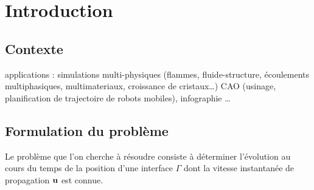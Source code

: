 \def\chapterabstract{}
\chapter{Introduction}

\section{Contexte}%

applications : simulations multi-physiques (flammes, fluide-structure, écoulements multiphasiques, multimateriaux, croissance de cristaux\ldots) CAO (usinage, planification de trajectoire de robots mobiles), infographie \ldots


\section{Formulation du problème}%
Le problème que l'on cherche à résoudre consiste à déterminer l'évolution au cours du temps de la position d'une interface $\Gamma$ dont la vitesse instantanée de propagation $\mathbf{u}$ est connue.
